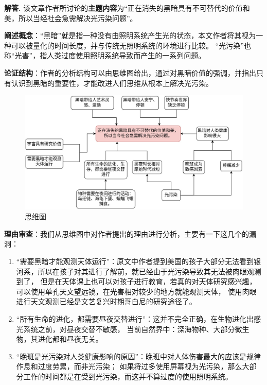 \documentclass[12pt, a4paper, oneside]{ctexart}
\newenvironment{solution}[1][]{\par\noindent\textbf{#1解答. }}{\smallskip\par}  %
\begin{document}
\begin{solution}
    该文章作者所讨论的\textbf{主题内容}为“正在消失的黑暗具有不可替代的价值和美，所以当经社会急需解决光污染问题”。

    \textbf{阐述概念}：“黑暗”就是指一种没有由照明系统产生光的状态，本文作者将其视为一种可以被量化的时间长度，并与传统无照明系统的环境进行比较。
    “光污染”也称“光害”，指人类过度使用照明系统导致而产生的一系列问题。

    \textbf{论证结构}：作者的分析结构可以由思维图给出，通过对黑暗价值的强调，并指出只有认识到黑暗的重要性，才能改进人们思维从根本上解决光污染。
    \begin{figure}[htbp]
        \centering
        \includegraphics[width=1.0\linewidth]{批判性思维第二次作业思维图.jpg}
        \caption{思维图}
    \end{figure}

    \textbf{理由审查}：我们从思维图中对作者提出的理由进行分析，主要有一下这几个的漏洞：
    \begin{enumerate}
        \item “需要黑暗才能观测天体运行”：原文中作者提到美国的孩子大部分无法看到银河系，所以在孩子对其进行了解前，就已经由于光污染导致其无法被肉眼观测到了，
        但是在天体课上也可以对孩子进行教育，若真的对天体研究感兴趣，可以使用单孔天文望远镜，在光害相对较少的地方就能观测天体，
        使用肉眼进行天文观测已经是文艺复兴时期哥白尼的研究途径了。
        \item “所有生命的进化，都需要昼夜交替进行”：这并不完全正确，在生物进化出感光系统之前，对昼夜交替不敏感，
        当前自然界中：深海物种、大部分微生物，其进化都和昼夜无关。
        \item “晚班是光污染对人类健康影响的原因”：晚班中对人体伤害最大的应该是规律作息和过度劳累，而非光污染；
        如果将过多使用屏幕视为光污染，那么大部分工作的时间都是在受到光污染，而这并不算过度的使用照明系统。
    \end{enumerate}


\end{solution}
\end{document}
